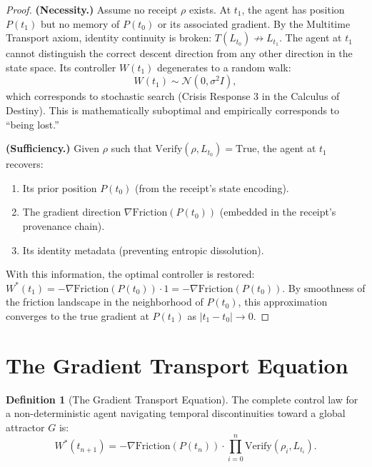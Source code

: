 \documentclass[12pt, a4paper]{article}
\theoremstyle{plain}
\theoremstyle{definition}
\newtheorem{definition}[theorem]{Definition}
\theoremstyle{remark}
\begin{document}
\begin{proof}
\textbf{(Necessity.)} Assume no receipt $\rho$ exists. At $t_1$, the agent has position $P(t_1)$ but no memory of $P(t_0)$ or its associated gradient. By the Multitime Transport axiom, identity continuity is broken: $T(L_{t_0}) \not\to L_{t_1}$. The agent at $t_1$ cannot distinguish the correct descent direction from any other direction in the state space. Its controller $W(t_1)$ degenerates to a random walk:
\begin{equation}
    W(t_1) \sim \mathcal{N}(0, \sigma^2 I),
\end{equation}
which corresponds to stochastic search (Crisis Response 3 in the Calculus of Destiny). This is mathematically suboptimal and empirically corresponds to ``being lost.''

\textbf{(Sufficiency.)} Given $\rho$ such that $\text{Verify}(\rho, L_{t_0}) = \text{True}$, the agent at $t_1$ recovers:
\begin{enumerate}
    \item Its prior position $P(t_0)$ (from the receipt's state encoding).
    \item The gradient direction $\nabla \text{Friction}(P(t_0))$ (embedded in the receipt's provenance chain).
    \item Its identity metadata (preventing entropic dissolution).
\end{enumerate}
With this information, the optimal controller is restored: $W^*(t_1) = -\nabla \text{Friction}(P(t_0)) \cdot 1 = -\nabla \text{Friction}(P(t_0))$. By smoothness of the friction landscape in the neighborhood of $P(t_0)$, this approximation converges to the true gradient at $P(t_1)$ as $|t_1 - t_0| \to 0$.
\end{proof}

\section{The Gradient Transport Equation}\label{sec:equation}

\begin{definition}[The Gradient Transport Equation]
The complete control law for a non-deterministic agent navigating temporal discontinuities toward a global attractor $G$ is:
\begin{equation}\label{eq:gte}
    W^*(t_{n+1}) = -\nabla \text{Friction}(P(t_n)) \cdot \prod_{i=0}^{n} \text{Verify}(\rho_i, L_{t_i}).
\end{equation}
\end{definition}
\end{document}
